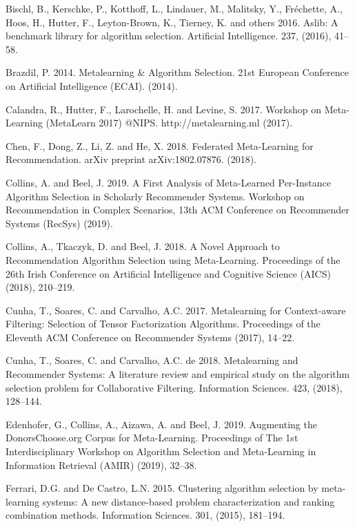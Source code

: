 \documentclass{article}
\begin{document}
\begin{thebibliography}{9}
Bischl, B., Kerschke, P., Kotthoff, L., Lindauer, M., Malitsky, Y., Fréchette, A., Hoos, H., Hutter, F., Leyton-Brown, K., Tierney, K. and others 2016. Aslib: A benchmark library for algorithm selection. Artificial Intelligence. 237, (2016), 41–58.

Brazdil, P. 2014. Metalearning \& Algorithm Selection. 21st European Conference on Artificial Intelligence (ECAI). (2014).

Calandra, R., Hutter, F., Larochelle, H. and Levine, S. 2017. Workshop on Meta-Learning (MetaLearn 2017) @NIPS. http://metalearning.ml (2017).

Chen, F., Dong, Z., Li, Z. and He, X. 2018. Federated Meta-Learning for Recommendation. arXiv preprint arXiv:1802.07876. (2018).

Collins, A. and Beel, J. 2019. A First Analysis of Meta-Learned Per-Instance Algorithm Selection in Scholarly Recommender Systems. Workshop on Recommendation in Complex Scenarios, 13th ACM Conference on Recommender Systems (RecSys) (2019).

Collins, A., Tkaczyk, D. and Beel, J. 2018. A Novel Approach to Recommendation Algorithm Selection using Meta-Learning. Proceedings of the 26th Irish Conference on Artificial Intelligence and Cognitive Science (AICS) (2018), 210–219.

Cunha, T., Soares, C. and Carvalho, A.C. 2017. Metalearning for Context-aware Filtering: Selection of Tensor Factorization Algorithms. Proceedings of the Eleventh ACM Conference on Recommender Systems (2017), 14–22.

Cunha, T., Soares, C. and Carvalho, A.C. de 2018. Metalearning and Recommender Systems: A literature review and empirical study on the algorithm selection problem for Collaborative Filtering. Information Sciences. 423, (2018), 128–144.

Edenhofer, G., Collins, A., Aizawa, A. and Beel, J. 2019. Augmenting the DonorsChoose.org Corpus for Meta-Learning. Proceedings of The 1st Interdisciplinary Workshop on Algorithm Selection and Meta-Learning in Information Retrieval (AMIR) (2019), 32–38.

Ferrari, D.G. and De Castro, L.N. 2015. Clustering algorithm selection by meta-learning systems: A new distance-based problem characterization and ranking combination methods. Information Sciences. 301, (2015), 181–194.


\end{thebibliography}
\end{document}
